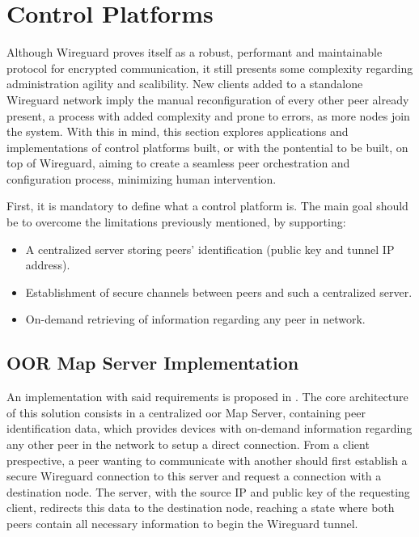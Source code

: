 \documentclass[11pt,twoside,a4paper]{report}
\begin{document}
\section{Control Platforms}

Although Wireguard proves itself as a robust, performant and maintainable protocol for encrypted communication, it still presents some complexity regarding administration agility and scalibility. New clients added to a standalone Wireguard network imply the manual reconfiguration of every other peer already present, a process with added complexity and prone to errors, as more nodes join the system. With this in mind, this section explores applications and implementations of control platforms built, or with the pontential to be built, on top of Wireguard, aiming to create a seamless peer orchestration and configuration process, minimizing human intervention.

First, it is mandatory to define what a control platform is. The main goal should be to overcome the limitations previously mentioned, by supporting:

\begin{itemize}
     \item A centralized server storing peers' identification (public key and tunnel IP address).
     \item Establishment of secure channels between peers and such a centralized server.
     \item On-demand retrieving of information regarding any peer in network.
\end{itemize}

\subsection{OOR Map Server Implementation}

An implementation with said requirements is proposed in \cite{paillisse2021control}. The core architecture of this solution consists in a centralized \acrlong{oor} Map Server, containing peer identification data, which provides devices with on-demand information regarding any other peer in the network to setup a direct connection.  From a client prespective, a peer wanting to communicate with another should first establish a secure Wireguard connection to this server and request a connection with a destination node. The server, with the source IP and public key of the requesting client, redirects this data to the destination node, reaching a state where both peers contain all necessary information to begin the Wireguard tunnel.
\end{document}
